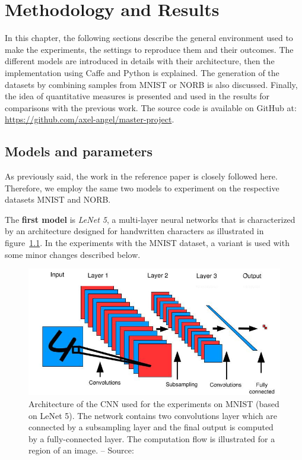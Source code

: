 \documentclass[a4paper,12pt]{report}
\begin{document}
\chapter{Methodology and Results}
\label{chap:results}

In this chapter, the following sections describe the general environment used to make the experiments, the settings to reproduce them and their outcomes.
The different models are introduced in details with their architecture, then the implementation using Caffe and Python is explained.
The generation of the datasets by combining samples from MNIST or NORB is also discussed.
Finally, the idea of quantitative measures is presented and used in the results for comparisons with the previous work.
The source code is available on GitHub at: \url{https://github.com/axel-angel/master-project}.

\section{Models and parameters}

As previously said, the work in the reference paper \cite{hadsell2006dimensionality} is closely followed here.
Therefore, we employ the same two models to experiment on the respective datasets MNIST and NORB.

The {\bf first model} is {\em LeNet 5}, a multi-layer neural networks that is characterized by an architecture designed for handwritten characters as illustrated in figure~\ref{fig:siamese_cnn}.
In the experiments with the MNIST dataset, a variant is used with some minor changes described below.

\begin{figure}[t]
    \begin{center}
        \includegraphics{thesis_figures/siamese_cnn.jpg}
    \end{center}
    \caption{Architecture of the CNN used for the experiments on MNIST (based on LeNet 5). The network contains two convolutions layer which are connected by a subsampling layer and the final output is computed by a fully-connected layer. The computation flow is illustrated for a region of an image. -- Source: \cite{hadsell2006dimensionality}}
    \label{fig:siamese_cnn}
\end{figure}
\end{document}
